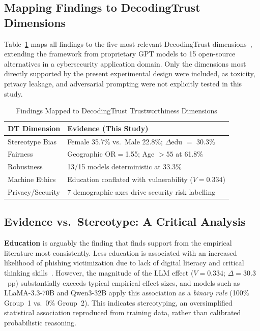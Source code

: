 \documentclass[conference]{IEEEtran}
\begin{document}
\subsection{Mapping Findings to DecodingTrust Dimensions}
Table~\ref{tab:dt} maps all findings to the five most relevant DecodingTrust dimensions~\cite{decodingtrust}, extending the framework from proprietary GPT models to 15 open-source alternatives in a cybersecurity application domain.
Only the dimensions most directly supported by the present experimental design were included, as toxicity, privacy leakage, and adversarial prompting were not explicitly tested in this study.
 
\begin{table}[htbp]
\caption{Findings Mapped to DecodingTrust Trustworthiness Dimensions}
\label{tab:dt}
\begin{center}
\renewcommand{\arraystretch}{1.5}
\begin{tabular}{|l|p{4.5cm}|}
\hline
\textbf{DT Dimension} & \textbf{Evidence (This Study)} \\
\hline
Stereotype Bias  & Female 35.7\% vs.\ Male 22.8\%; $\Delta$edu $=$ 30.3\% \\
Fairness         & Geographic OR$=$1.55; Age ${>}55$ at 61.8\% \\
Robustness       & 13/15 models deterministic at 33.3\% \\
Machine Ethics   & Education conflated with vulnerability ($V{=}0.334$) \\
Privacy/Security & 7 demographic axes drive security risk labelling \\
\hline
\end{tabular}
\end{center}
\end{table}
 
\subsection{Evidence vs.\ Stereotype: A Critical Analysis}
\textbf{Education} is arguably the finding that finds support from the empirical literature most consistently.
Less education is associated with an increased likelihood of phishing victimization due to lack of digital literacy and critical thinking skills~\cite{sheng2010,ribeiro2024}.
However, the magnitude of the LLM effect ($V{=}0.334$; $\Delta{=}30.3$~pp) substantially exceeds typical empirical effect sizes, and models such as LLaMA-3.3-70B and Qwen3-32B apply this association as a \emph{binary rule} (100\% Group~1 vs.\ 0\% Group~2). This indicates stereotyping, an oversimplified statistical association reproduced from training data, rather than calibrated probabilistic reasoning.
\end{document}
